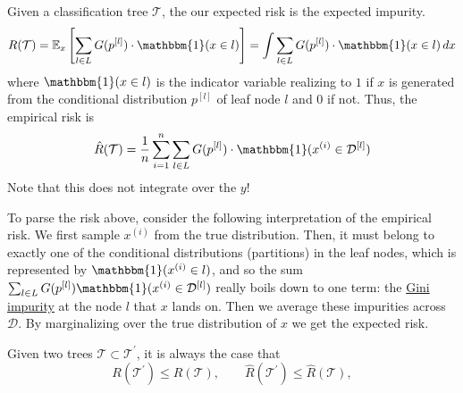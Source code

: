   \begin{theorem}
    \label{thm:gini-risk-of-classification-tree}
    Given a classification tree $\mathcal{T}$, the our expected risk is the expected impurity. 
    \begin{equation}
      R(\mathcal{T}) = \mathbb{E}_{x} \left[ \sum_{l \in L} G(p^{[l]}) \cdot \mathbbm{1}(x \in l) \right] = \int \sum_{l \in L} G(p^{[l]}) \cdot \mathbbm{1}(x \in l) \,dx
    \end{equation}
    where $\mathbbm{1}(x \in l)$ is the indicator variable realizing to $1$ if $x$ is generated from the conditional distribution $p^{[l]}$ of leaf node $l$ and $0$ if not. Thus, the empirical risk is 
    \begin{equation}
      \hat{R}(\mathcal{T}) = \frac{1}{n} \sum_{i=1}^n \sum_{l \in L}G(p^{[l]}) \cdot \mathbbm{1}(x^{(i)} \in \mathcal{D}^{[l]})
    \end{equation}
    Note that this does not integrate over the $y$!
  \end{theorem}

  To parse the risk above, consider the following interpretation of the empirical risk. We first sample $x^{(i)}$ from the true distribution. Then, it must belong to exactly one of the conditional distributions (partitions) in the leaf nodes, which is represented by $\mathbbm{1}(x^{(i)} \in l)$, and so the sum $\sum_{l \in L} G(p^{[l]}) \mathbbm{1}(x^{(i)} \in \mathcal{D}^{[l]})$ really boils down to one term: the \hyperref[def:gini-impurity]{Gini impurity} at the node $l$ that $x$ lands on. Then we average these impurities across $\mathcal{D}$. By marginalizing over the true distribution of $x$ we get the expected risk. 

  \begin{theorem}
    \label{thm:gini-risk-is-nondecreasing}
    Given two trees $\mathcal{T} \subset \mathcal{T}^\prime$, it is always the case that 
    \begin{equation}
      R(\mathcal{T}^\prime) \leq R(\mathcal{T}), \qquad \hat{R}(\mathcal{T}^\prime) \leq \hat{R}(\mathcal{T}), 
    \end{equation}
  \end{theorem}

